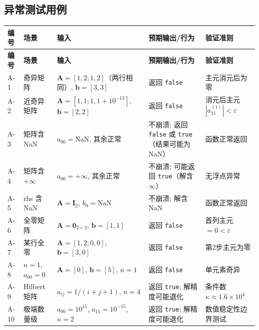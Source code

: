 \documentclass[a4paper,10pt]{article}
\begin{document}
\subsection{异常测试用例}

{\small
\begin{longtable}{|C{0.6cm}|L{1.8cm}|L{4.8cm}|L{3.8cm}|L{3.5cm}|}
\hline
\textbf{编号} & \textbf{场景} & \textbf{输入} & \textbf{预期输出/行为} & \textbf{验证准则} \\
\hline
\endfirsthead
\hline
\textbf{编号} & \textbf{场景} & \textbf{输入} & \textbf{预期输出/行为} & \textbf{验证准则} \\
\hline
\endhead
A-1 &
奇异矩阵 &
$\mathbf{A}{=}[1,2;1,2]$（两行相同）, $\mathbf{b}{=}[3,3]$ &
返回 \texttt{false} &
主元消元后为零 \\
\hline
A-2 &
近奇异矩阵 &
$\mathbf{A}{=}[1,1;1,1{+}10^{-13}]$, $\mathbf{b}{=}[2,2]$ &
返回 \texttt{false} &
消元后主元 $|a_{11}^{(1)}| < \varepsilon$ \\
\hline
A-3 &
矩阵含 NaN &
$a_{00}{=}\text{NaN}$, 其余正常 &
不崩溃; 返回 \texttt{false} 或 \texttt{true}（结果可能为 NaN） &
函数正常返回 \\
\hline
A-4 &
矩阵含 $+\infty$ &
$a_{00}{=}+\infty$, 其余正常 &
不崩溃; 可能返回 \texttt{true}（解含 $\infty$） &
无浮点异常 \\
\hline
A-5 &
rhs 含 NaN &
$\mathbf{A}{=}\mathbf{I}_2$, $b_0{=}\text{NaN}$ &
不崩溃; 解含 NaN &
函数正常返回 \\
\hline
A-6 &
全零矩阵 &
$\mathbf{A}{=}\mathbf{0}_{2 \times 2}$, $\mathbf{b}{=}[1,1]$ &
返回 \texttt{false} &
首列主元 $= 0 < \varepsilon$ \\
\hline
A-7 &
某行全零 &
$\mathbf{A}{=}[1,2;0,0]$, $\mathbf{b}{=}[3,0]$ &
返回 \texttt{false} &
第2步主元为零 \\
\hline
A-8 &
$n{=}1$, $a_{00}{=}0$ &
$\mathbf{A}{=}[0]$, $\mathbf{b}{=}[5]$, $n{=}1$ &
返回 \texttt{false} &
单元素奇异 \\
\hline
A-9 &
Hilbert 矩阵 &
$a_{ij}{=}1/(i{+}j{+}1)$, $n{=}4$ &
返回 \texttt{true}; 解精度可能退化 &
条件数 $\kappa \approx 1.6 \times 10^{4}$ \\
\hline
A-10 &
极端数量级 &
$a_{00}{=}10^{15}$, $a_{11}{=}10^{-15}$, $n{=}2$ &
返回 \texttt{true}; 解精度可能退化 &
数值稳定性边界测试 \\
\hline
\end{longtable}
}
\end{document}
